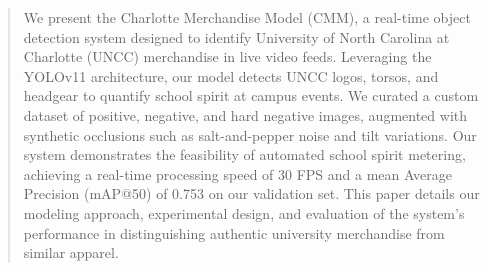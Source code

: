 \begin{abstract}
We present the Charlotte Merchandise Model (CMM), a real-time object detection system designed to identify University of North Carolina at Charlotte (UNCC) merchandise in live video feeds. Leveraging the YOLOv11 architecture, our model detects UNCC logos, torsos, and headgear to quantify school spirit at campus events. We curated a custom dataset of positive, negative, and hard negative images, augmented with synthetic occlusions such as salt-and-pepper noise and tilt variations. Our system demonstrates the feasibility of automated school spirit metering, achieving a real-time processing speed of 30 FPS and a mean Average Precision (mAP@50) of 0.753 on our validation set. This paper details our modeling approach, experimental design, and evaluation of the system's performance in distinguishing authentic university merchandise from similar apparel.
\end{abstract}
